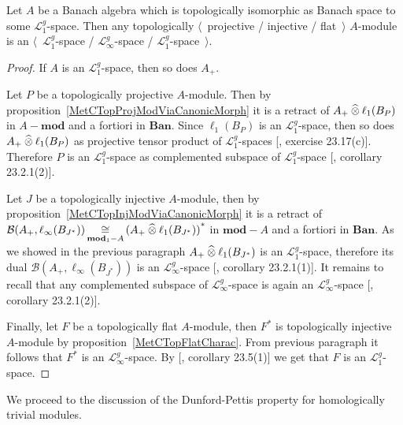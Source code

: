 \begin{proposition}\label{TopProjInjFlatModOverMthscrL1SpCharac} Let $A$ be a
Banach algebra which is topologically isomorphic as Banach space to some
$\mathscr{L}_1^g$-space. Then any topologically $\langle$~projective / injective
/ flat~$\rangle$ $A$-module is an $\langle$~$\mathscr{L}_1^g$-space /
$\mathscr{L}_\infty^g$-space / $\mathscr{L}_1^g$-space~$\rangle$.
\end{proposition}
\begin{proof} If $A$ is an $\mathscr{L}_1^g$-space, then so does $A_+$. 

Let $P$ be a topologically projective $A$-module. Then by
proposition~\ref{MetCTopProjModViaCanonicMorph} it is a retract 
of $A_+\mathbin{\widehat{\otimes}} \ell_1(B_P)$ in $A-\mathbf{mod}$ and a fortiori 
in $\mathbf{Ban}$. Since
$\ell_1(B_P)$ is an $\mathscr{L}_1^g$-space, then so does
$A_+\mathbin{\widehat{\otimes}}\ell_1(B_P)$ as projective tensor product of
$\mathscr{L}_1^g$-spaces [\cite{DefFloTensNorOpId}, exercise 23.17(c)].
Therefore $P$ is an $\mathscr{L}_1^g$-space as complemented subspace of
$\mathscr{L}_1^g$-space [\cite{DefFloTensNorOpId}, corollary 23.2.1(2)].

Let $J$ be a topologically injective $A$-module, then by
proposition~\ref{MetCTopInjModViaCanonicMorph} it is a retract of
$\mathcal{B}(A_+,\ell_\infty(B_{J^*}))
\mathop{\mathbin{\cong}}\limits_{\mathbf{mod}_1-A}
{(A_+\mathbin{\widehat{\otimes}}\ell_1(B_{J^*}))}^*$
in $\mathbf{mod}-A$ and a fortiori in $\mathbf{Ban}$. As we showed in the
previous paragraph $A_+\mathbin{\widehat{\otimes}}\ell_1(B_{J^*})$ is an $\mathscr{L}_1^g$-space,
therefore its dual $\mathcal{B}(A_+,\ell_\infty(B_{J^*}))$ is an
$\mathscr{L}_\infty^g$-space [\cite{DefFloTensNorOpId}, corollary 23.2.1(1)]. It
remains to recall that any complemented subspace of $\mathscr{L}_\infty^g$-space
is again an $\mathscr{L}_\infty^g$-space [\cite{DefFloTensNorOpId}, corollary
23.2.1(2)].

Finally, let $F$ be a topologically flat $A$-module, then $F^*$ is topologically
injective $A$-module by proposition~\ref{MetCTopFlatCharac}. From previous
paragraph it follows that $F^*$ is an $\mathscr{L}_\infty^g$-space. By
[\cite{DefFloTensNorOpId}, corollary 23.5(1)] we get that $F$ is an
$\mathscr{L}_1^g$-space.
\end{proof}

We proceed to the discussion of the Dunford-Pettis property for homologically
trivial modules.   

